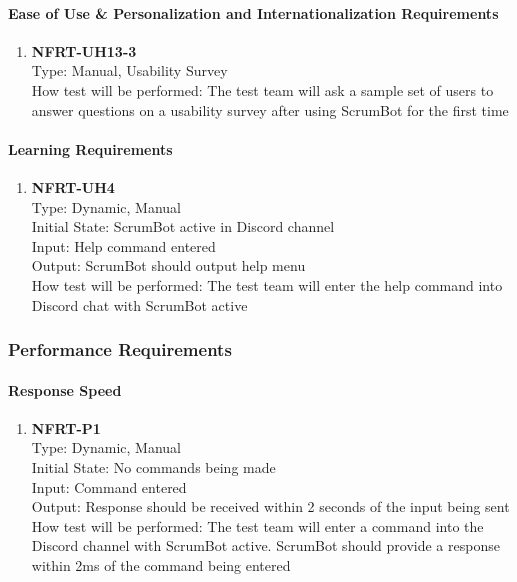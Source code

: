 \documentclass[12pt, titlepage]{article}
\begin{document}
\paragraph{Ease of Use \& Personalization and Internationalization Requirements}
\begin{enumerate}
\item{\textbf{NFRT-UH13-3}}\\
Type: Manual, Usability Survey\\
How test will be performed: The test team will ask a sample set of users to answer questions on a usability survey after using ScrumBot for the first time
\end{enumerate}

\paragraph{Learning Requirements}
\begin{enumerate}
\item{\textbf{NFRT-UH4}}\\
Type: Dynamic, Manual\\
Initial State: ScrumBot active in Discord channel\\
Input: Help command entered\\
Output: ScrumBot should output help menu\\
How test will be performed: The test team will enter the help command into Discord chat with ScrumBot active
\end{enumerate}

\subsubsection{Performance Requirements}
\paragraph{Response Speed}
\begin{enumerate}
\item{\textbf{NFRT-P1}}\\
Type: Dynamic, Manual\\
Initial State: No commands being made\\
Input: Command entered\\
Output: Response should be received within 2 seconds of the input being sent\\
How test will be performed: The test team will enter a command into the Discord channel with ScrumBot active. ScrumBot should provide a response within 2ms of the command being entered
\end{enumerate}
\end{document}
